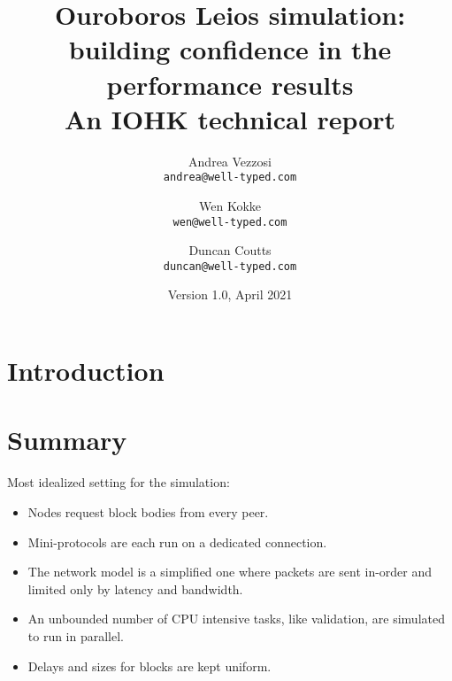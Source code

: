 \documentclass[11pt,a4paper]{article}
\begin{document}
\title{Ouroboros Leios simulation: \\
building confidence in the performance results \\
{\large \sc An IOHK technical report}
}
\date{Version 1.0, April 2021}
\author{Andrea Vezzosi     \\ {\small \texttt{andrea@well-typed.com}} \\
\and Wen Kokke          \\ {\small \texttt{wen@well-typed.com}} \\
\and Duncan Coutts      \\ {\small \texttt{duncan@well-typed.com}}
}

\maketitle

\section{Introduction}
\label{introduction}


\tableofcontents

\listoftodos

\section{Summary}
\label{summary}

Most idealized setting for the simulation:
\begin{itemize}
    \item Nodes request block bodies from every peer.
    \item Mini-protocols are each run on a dedicated connection.
    \item The network model is a simplified one where packets are sent in-order and
          limited only by latency and bandwidth.
    \item An unbounded number of CPU intensive tasks, like validation, are simulated to run in parallel.
    \item Delays and sizes for blocks are kept uniform.
\end{itemize}
\end{document}
